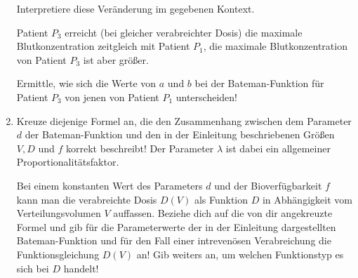 \begin{langesbeispiel}
\begin{enumerate}
	Interpretiere diese Veränderung im gegebenen Kontext.\leer
	
	Patient $P_3$ erreicht (bei gleicher verabreichter Dosis) die maximale Blutkonzentration zeitgleich mit Patient $P_1$, die maximale Blutkonzentration von Patient $P_3$ ist aber größer.
	
	Ermittle, wie sich die Werte von $a$ und $b$ bei der Bateman-Funktion für Patient $P_3$ von jenen von Patient $P_1$ unterscheiden!\leer
	
	\item Kreuze diejenige Formel an, die den Zusammenhang zwischen dem Parameter $d$ der Bateman-Funktion und den in der Einleitung beschriebenen Größen $V,D$ und $f$ korrekt beschreibt! Der Parameter $\lambda$ ist dabei ein allgemeiner Proportionalitätsfaktor.
	
					
Bei einem konstanten Wert des Parameters $d$ und der Bioverfügbarkeit $f$ kann man die verabreichte Dosis $D(V)$ als Funktion $D$ in Abhängigkeit vom Verteilungsvolumen $V$ auffassen. Beziehe dich auf die von dir angekreuzte Formel und gib für die Parameterwerte der in der Einleitung dargestellten Bateman-Funktion und für den Fall einer intrevenösen Verabreichung die Funktionsgleichung $D(V)$ an! Gib weiters an, um welchen Funktionstyp es sich bei $D$ handelt!
\end{enumerate}

\end{langesbeispiel}
